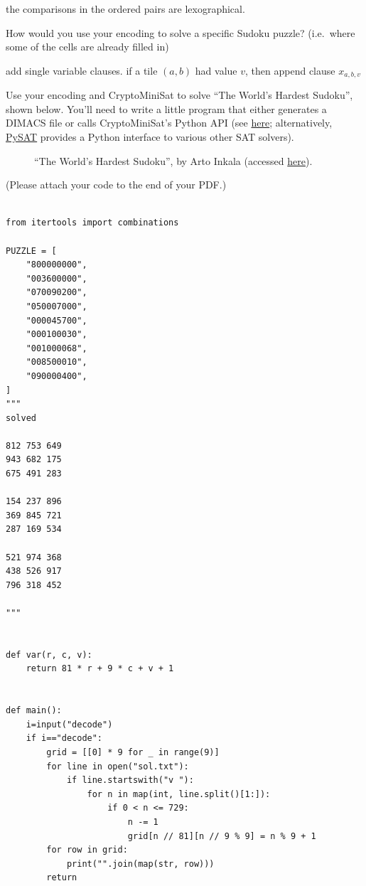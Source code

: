 \documentclass[11pt]{article}
\begin{document}
\begin{qunlist}
\begin{qparts}
\begin{answer}
\begin{enumerate}[i.]
          the comparisons in the ordered pairs are lexographical.


      \end{enumerate}
    \end{answer}

  \item
    How would you use your encoding to solve a specific Sudoku puzzle? (i.e.~where some of the cells are already filled in)

    \begin{answer}
      add single variable clauses. if a tile \((a,b)\) had value \(v\), then append clause \(x_{a,b,v}\)
    \end{answer}

  \item
    Use your encoding and CryptoMiniSat to solve ``The World's Hardest Sudoku'', shown below.
    You'll need to write a little program that either generates a DIMACS file or calls CryptoMiniSat's Python API (see  \href{https://github.com/msoos/cryptominisat/tree/master/python}{here}; alternatively, \href{https://pysathq.github.io/}{PySAT} provides a Python interface to various other SAT solvers).

    \begin{figure}[h]
      \centering
      \caption{``The World's Hardest Sudoku'', by Arto Inkala (accessed \href{https://web.archive.org/web/20170919033818/http://gizmodo.com/can-you-solve-the-10-hardest-logic-puzzles-ever-created-1064112665}{here}).}
    \end{figure}

    \begin{answer}
      (Please attach your code to the end of your PDF.)
      \begin{verbatim}

from itertools import combinations

PUZZLE = [
    "800000000",
    "003600000",
    "070090200",
    "050007000",
    "000045700",
    "000100030",
    "001000068",
    "008500010",
    "090000400",
]
"""
solved

812 753 649
943 682 175
675 491 283

154 237 896
369 845 721
287 169 534

521 974 368
438 526 917
796 318 452

"""


def var(r, c, v):
    return 81 * r + 9 * c + v + 1


def main():
    i=input("decode")
    if i=="decode":
        grid = [[0] * 9 for _ in range(9)]
        for line in open("sol.txt"):
            if line.startswith("v "):
                for n in map(int, line.split()[1:]):
                    if 0 < n <= 729:
                        n -= 1
                        grid[n // 81][n // 9 % 9] = n % 9 + 1
        for row in grid:
            print("".join(map(str, row)))
        return


\end{verbatim}
\end{answer}
\end{qparts}
\end{qunlist}
\end{document}
